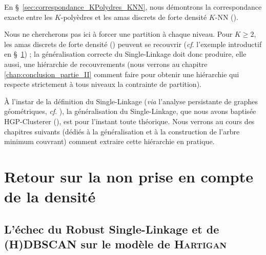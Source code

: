 En \S~\ref{sec:correspondance_KPolydres_KNN}, nous démontrons la correspondance exacte entre les $K$-polyèdres et les amas discrets de forte densité $K$-NN ().

Nous ne chercherons pas ici à forcer une partition à chaque niveau. Pour $K\ge 2$, les amas discrets de forte densité () peuvent se recouvrir (\emph{cf}. l'exemple introductif en \S~\ref{sec:exemple_introductif}) ; la généralisation correcte du Single-Linkage doit donc produire, elle aussi, une hiérarchie de recouvrements (nous verrons au chapitre \ref{chap:conclusion_partie_II} comment faire pour obtenir une hiérarchie qui respecte strictement à tous niveaux la contrainte de partition).

À l'instar de la définition du Single-Linkage (\emph{via} l'analyse persistante de graphes géométriques, \emph{cf}. ), la généralisation du Single-Linkage, que nous avons baptisée HGP-Clusterer (), est pour l'instant toute théorique. Nous verrons au cours des chapitres suivants (dédiés à la généralisation et à la construction de l'arbre minimum couvrant) comment extraire cette hiérarchie en pratique.



\section{Retour sur la non prise en compte de la densité}
\label{sec:exemple_introductif}

\subsection{L'échec du Robust Single-Linkage et de (H)DBSCAN sur le modèle de \textsc{Hartigan}}

